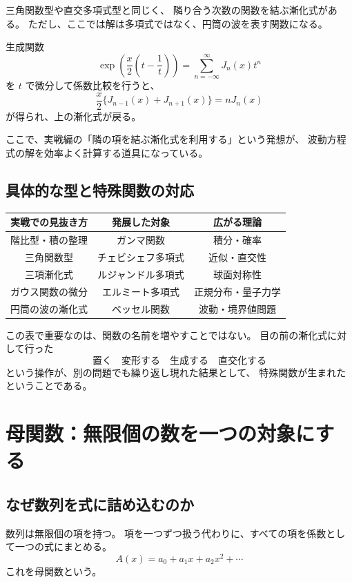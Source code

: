 三角関数型や直交多項式型と同じく、
隣り合う次数の関数を結ぶ漸化式がある。
ただし、ここでは解は多項式ではなく、円筒の波を表す関数になる。

生成関数
\[
  \exp\left(\frac{x}{2}\left(t-\frac1t\right)\right)
  =\sum_{n=-\infty}^{\infty}J_n(x)t^n
\]
を $t$ で微分して係数比較を行うと、
\[
  \frac{x}{2}\{J_{n-1}(x)+J_{n+1}(x)\}
  =nJ_n(x)
\]
が得られ、上の漸化式が戻る。

ここで、実戦編の「隣の項を結ぶ漸化式を利用する」という発想が、
波動方程式の解を効率よく計算する道具になっている。

\subsection{具体的な型と特殊関数の対応}

\begin{center}
\begin{tabular}{c|c|c}
  実戦での見抜き方 & 発展した対象 & 広がる理論\\ \hline
  階比型・積の整理 & ガンマ関数 & 積分・確率\\
  三角関数型 & チェビシェフ多項式 & 近似・直交性\\
  三項漸化式 & ルジャンドル多項式 & 球面対称性\\
  ガウス関数の微分 & エルミート多項式 & 正規分布・量子力学\\
  円筒の波の漸化式 & ベッセル関数 & 波動・境界値問題\\
\end{tabular}
\end{center}

この表で重要なのは、関数の名前を増やすことではない。
目の前の漸化式に対して行った
\[
  \text{置く}\quad
  \text{変形する}\quad
  \text{生成する}\quad
  \text{直交化する}
\]
という操作が、別の問題でも繰り返し現れた結果として、
特殊関数が生まれたということである。

\section{母関数：無限個の数を一つの対象にする}

\subsection{なぜ数列を式に詰め込むのか}

数列は無限個の項を持つ。
項を一つずつ扱う代わりに、すべての項を係数として一つの式にまとめる。
\[
  A(x)=a_0+a_1x+a_2x^2+\cdots
\]
これを母関数という。

